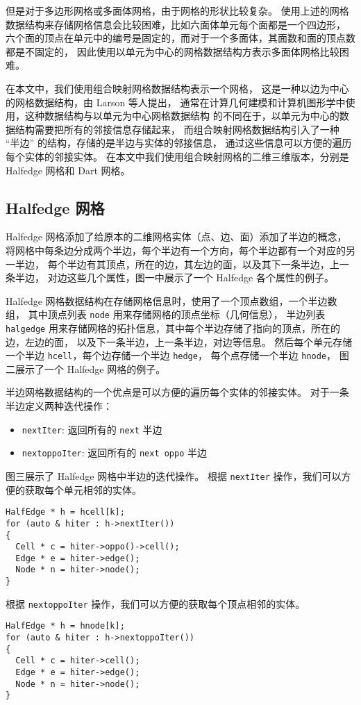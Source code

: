 但是对于多边形网格或多面体网格，由于网格的形状比较复杂。
使用上述的网格数据结构来存储网格信息会比较困难，比如六面体单元每个面都是一个四边形，
六个面的顶点在单元中的编号是固定的，而对于一个多面体，其面数和面的顶点数都是不固定的，
因此使用以单元为中心的网格数据结构方表示多面体网格比较困难。

在本文中，我们使用组合映射网格数据结构表示一个网格，
这是一种以边为中心的网格数据结构，由 Larson 等人提出，
通常在计算几何建模和计算机图形学中使用，这种数据结构与以单元为中心网格数据结构
的不同在于，以单元为中心的数据结构需要把所有的邻接信息存储起来，
而组合映射网格数据结构引入了一种 “半边”
的结构，存储的是半边与实体的邻接信息，
通过这些信息可以方便的遍历每个实体的邻接实体。
在本文中我们使用组合映射网格的二维三维版本，分别是 Halfedge 网格和 Dart 网格。

\subsection{Halfedge 网格}
Halfedge 网格添加了给原本的二维网格实体（点、边、面）添加了半边的概念，
将网格中每条边分成两个半边，每个半边有一个方向，每个半边都有一个对应的另一半边，
每个半边有其顶点，所在的边，其左边的面，以及其下一条半边，上一条半边，
对边这些几个属性，图一中展示了一个 Halfedge 各个属性的例子。

Halfedge 网格数据结构在存储网格信息时，使用了一个顶点数组，一个半边数组，
其中顶点列表 \lstinline{node} 用来存储网格的顶点坐标（几何信息），
半边列表 \lstinline{halgedge}
用来存储网格的拓扑信息，其中每个半边存储了指向的顶点，所在的边，左边的面，
以及下一条半边，上一条半边，对边等信息。
然后每个单元存储一个半边 \lstinline{hcell}，每个边存储一个半边 \lstinline{hedge}，
每个点存储一个半边 \lstinline{hnode}， 
图二展示了一个 Halfedge 网格的例子。

半边网格数据结构的一个优点是可以方便的遍历每个实体的邻接实体。
对于一条半边定义两种迭代操作：
\begin{itemize}
    \item \lstinline{nextIter}: 返回所有的 \lstinline{next} 半边
    \item \lstinline{nextoppoIter}: 返回所有的 \lstinline{next oppo} 半边 
\end{itemize}
图三展示了 Halfedge 网格中半边的迭代操作。
根据 \lstinline{nextIter} 操作，我们可以方便的获取每个单元相邻的实体。
\begin{lstlisting}
HalfEdge * h = hcell[k];
for (auto & hiter : h->nextIter()) 
{
  Cell * c = hiter->oppo()->cell();
  Edge * e = hiter->edge();
  Node * n = hiter->node();
}
\end{lstlisting}
根据 \lstinline{nextoppoIter} 操作，我们可以方便的获取每个顶点相邻的实体。
\begin{lstlisting}
HalfEdge * h = hnode[k];
for (auto & hiter : h->nextoppoIter()) 
{
  Cell * c = hiter->cell();
  Edge * e = hiter->edge();
  Node * n = hiter->node();
}
\end{lstlisting}
